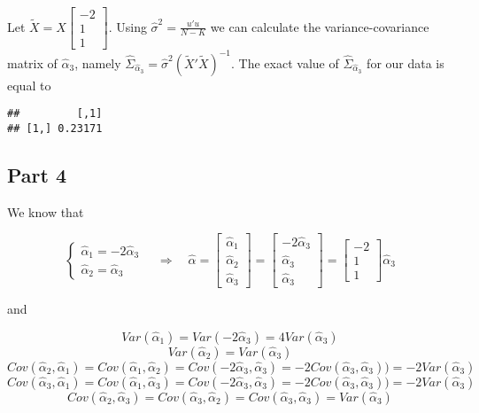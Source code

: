 \documentclass[12pt, a4paper]{article}\usepackage[]{graphicx}\usepackage[]{color}
\makeatletter
\newenvironment{kframe}{%
 \def\at@end@of@kframe{}%
 \ifinner\ifhmode%
  \def\at@end@of@kframe{\end{minipage}}%
  \begin{minipage}{\columnwidth}%
 \fi\fi%
 \def\FrameCommand##1{\hskip\@totalleftmargin \hskip-\fboxsep
 \colorbox{shadecolor}{##1}\hskip-\fboxsep
     \hskip-\linewidth \hskip-\@totalleftmargin \hskip\columnwidth}%
 \MakeFramed {\advance\hsize-\width
   \@totalleftmargin\z@ \linewidth\hsize
   \@setminipage}}%
 {\par\unskip\endMakeFramed%
 \at@end@of@kframe}
\newenvironment{knitrout}{}{} %
\makeatother
\begin{document}
Let $\tilde{X} = X \begin{bmatrix} -2 \\ 1 \\ 1 \end{bmatrix}$. Using $\hat{\sigma}^2 = \frac{u'u}{N-K}$ we can calculate the variance-covariance matrix of $\hat{\alpha}_3$, namely $\hat{\Sigma}_{\hat{\alpha}_3} = \hat{\sigma}^2 (\tilde{X}' \tilde{X})^{-1}$.
The exact value of $\hat{\Sigma}_{\hat{\alpha}_3}$ for our data is equal to
\begin{knitrout}
\color{fgcolor}\begin{kframe}
\begin{verbatim}
##         [,1]
## [1,] 0.23171
\end{verbatim}
\end{kframe}
\end{knitrout}


\subsection{Part 4}
We know that

\[ 
  \begin{cases}
    \hat{\alpha}_1 =-2 \hat{\alpha}_3 \\
    \hat{\alpha}_2 = \hat{\alpha}_3
  \end{cases}
  \quad \Rightarrow \quad
  \hat{\alpha} = 
  \begin{bmatrix}  
      \hat{\alpha}_1 \\ \hat{\alpha}_2 \\ \hat{\alpha}_3
  \end{bmatrix} 
  =
  \begin{bmatrix}  
      -2 \hat{\alpha}_3 \\ \hat{\alpha}_3 \\ \hat{\alpha}_3
  \end{bmatrix} 
  =
  \begin{bmatrix}  
      -2 \\ 1 \\ 1
  \end{bmatrix} 
  \hat{\alpha}_3
\]

and

\[ Var(\hat{\alpha}_1) = Var(-2\hat{\alpha}_3) = 4 Var(\hat{\alpha}_3)\]
\[ Var(\hat{\alpha}_2) = Var(\hat{\alpha}_3) \]
\[ Cov(\hat{\alpha}_2,\hat{\alpha}_1) = Cov(\hat{\alpha}_1,\hat{\alpha}_2) = Cov(-2 \hat{\alpha}_3, \hat{\alpha}_3)= -2 Cov(\hat{\alpha}_3, \hat{\alpha}_3)) = 
  -2 Var(\hat{\alpha}_3) \]
\[ Cov(\hat{\alpha}_3,\hat{\alpha}_1) = Cov(\hat{\alpha}_1,\hat{\alpha}_3) = Cov(-2 \hat{\alpha}_3, \hat{\alpha}_3) = -2 Cov(\hat{\alpha}_3, \hat{\alpha}_3)) = 
  -2 Var(\hat{\alpha}_3) \]
\[ Cov(\hat{\alpha}_2,\hat{\alpha}_3) = Cov(\hat{\alpha}_3,\hat{\alpha}_2) = Cov(\hat{\alpha}_3, \hat{\alpha}_3) = Var(\hat{\alpha}_3) \]
\end{document}
